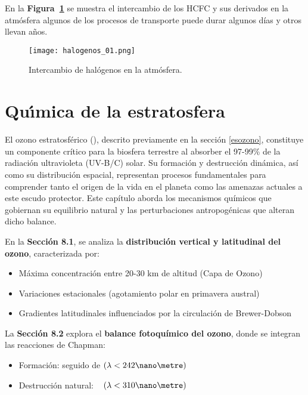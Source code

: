 En la \textbf{Figura~\ref{halo_01}} se muestra el intercambio de los HCFC y sus derivados en la atmósfera algunos de los procesos de transporte puede durar algunos días y otros llevan años.

\begin{figure}[htbp]
\begin{center}
\texttt{[image: halogenos\_01.png]}
\caption{Intercambio de halógenos en la atmósfera.}
\label{halo_01}
\end{center}
\end{figure}

%  
%  

\chapter{Qu\'{\i}mica de la estratosfera}

El ozono estratosférico (), descrito previamente en la sección \ref{esozono}, constituye un componente crítico para la biosfera terrestre al absorber el 97-99\% de la radiación ultravioleta (UV-B/C) solar. Su formación y destrucción dinámica, así como su distribución espacial, representan procesos fundamentales para comprender tanto el origen de la vida en el planeta como las amenazas actuales a este escudo protector. Este capítulo aborda los mecanismos químicos que gobiernan su equilibrio natural y las perturbaciones antropogénicas que alteran dicho balance.

En la \textbf{Sección 8.1}, se analiza la \textbf{distribución vertical y latitudinal del ozono}, caracterizada por:
\begin{itemize}
    \item Máxima concentración entre 20-30 km de altitud (Capa de Ozono)
    \item Variaciones estacionales (agotamiento polar en primavera austral)
    \item Gradientes latitudinales influenciados por la circulación de Brewer-Dobson
\end{itemize}

La \textbf{Sección 8.2} explora el \textbf{balance fotoquímico del ozono}, donde se integran las reacciones de Chapman:
\begin{itemize}
    \item Formación:  seguido de  $(\lambda < 242 \nano\metre)$
    \item Destrucción natural:  ~ $(\lambda < 310 \nano\metre)$
\end{itemize}

